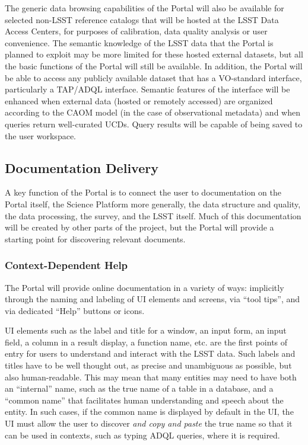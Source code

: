 The generic data browsing capabilities of the Portal will also be available for selected non-LSST reference catalogs that will be hosted at the LSST Data Access Centers, for purposes of calibration, data quality analysis or user convenience.
The semantic knowledge of the LSST data that the Portal is planned to exploit may be more limited for these hosted external datasets, but all the basic functions of the Portal will still be available.
In addition, the Portal will be able to access any publicly available dataset that has a VO-standard interface, particularly a TAP/ADQL interface.
Semantic features of the interface will be enhanced when external data (hosted or remotely accessed) are organized according to the CAOM model (in the case of observational metadata) and when queries return well-curated UCDs.
Query results will be capable of being saved to the user workspace.

\subsection{Documentation Delivery}\label{documentation-delivery}

A key function of the Portal is to connect the user to documentation on the Portal itself, the Science Platform more generally, the data structure and quality, the data processing, the survey, and the LSST itself.
Much of this documentation will be created by other parts of the project, but the Portal will provide a starting point for discovering relevant documents.

\subsubsection{Context-Dependent Help}\label{context-dependent-help}

The Portal will provide online documentation in a variety of ways: implicitly through the naming and labeling of UI elements and screens, via ``tool tips'', and via dedicated ``Help'' buttons or icons.

UI elements such as the label and title for a window, an input form, an input field, a column in a result display, a function name, etc. are the first points of entry for users to understand and interact with the LSST data. 
Such labels and titles have to be well thought out, as precise and unambiguous as possible, but also human-readable.
This may mean that many entities may need to have both an ``internal'' name, such as the true name of a table in a database, and a ``common name'' that facilitates human understanding and speech about the entity.
In such cases, if the common name is displayed by default in the UI, the UI must allow the user to discover \emph{and copy and paste} the true name so that it can be used in contexts, such as typing ADQL queries, where it is required.

